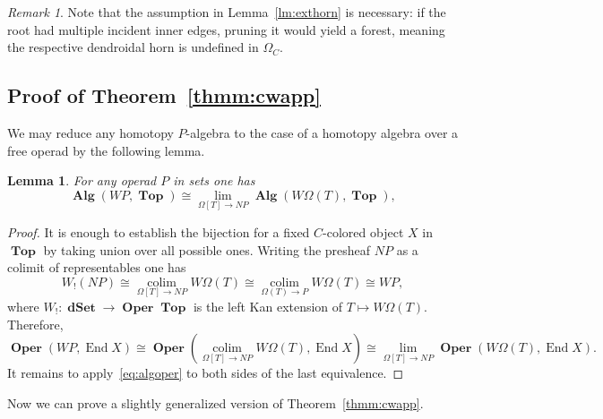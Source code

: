 \documentclass{amsart}
\newtheorem{lemma}[formula]{Lemma}
\theoremstyle{definition}
\theoremstyle{remark}
\newtheorem{remark}[formula]{Remark}
\DeclareMathOperator{\col}{colim}
\DeclareMathOperator{\Top}{\mathbf{Top}}
\DeclareMathOperator{\Oper}{\mathbf{Oper}}
\DeclareMathOperator{\Alg}{\mathbf{Alg}}
\DeclareMathOperator{\End}{End}
\DeclareMathOperator{\dset}{\mathbf{dSet}}
\begin{document}
	\begin{remark}
		Note that the assumption in Lemma~\ref{lm:exthorn} is necessary: if the root had multiple incident inner edges, pruning it would yield a forest, meaning the respective dendroidal horn is undefined in $\Omega_{C}$.
	\end{remark}
	
	\subsection{Proof of Theorem~\ref{thmm:cwapp}}\label{ssec:pf1}
	
	We may reduce any homotopy $P$-algebra to the case of a homotopy algebra over a free operad by the following lemma.
	
	\begin{lemma}\label{lm:red}
		For any operad $P$ in sets one has
		\[
		\Alg(WP,\Top)\cong \lim_{\Omega[T]\to NP} \Alg(W\Omega(T),\Top),
		\]
	\end{lemma}
	\begin{proof}
		It is enough to establish the bijection for a fixed $C$-colored object $X$ in $\Top$ by taking union over all possible ones.
		Writing the presheaf $NP$ as a colimit of representables one has
		\[
		W_{!}(NP)\cong
		\underset{\Omega[T]\to NP}{\col} W\Omega(T)\cong
		\underset{\Omega(T)\to P}{\col} W\Omega(T)\cong	
		WP,
		\]
		where $W_{!}\colon \dset \to \Oper\Top$ is the left Kan extension of $T\mapsto W\Omega(T)$.
		Therefore, 
		\[
		\Oper(WP,\End X)\cong
		\Oper\left(\underset{\Omega[T]\to NP}{\col} 	W\Omega(T),\End X\right)\cong
		\underset{\Omega[T]\to NP}{\lim} \Oper(W\Omega(T),\End 	X).
		\]
		It remains to apply~\eqref{eq:algoper} to both sides of the last equivalence.
	\end{proof}
	
	Now we can prove a slightly generalized version of Theorem~\ref{thmm:cwapp}.
	
\end{document}
